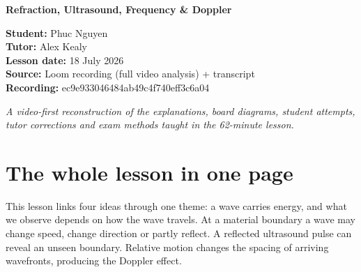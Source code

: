 \documentclass[11pt,a4paper]{article}
\begin{document}
\begin{titlepage}
\centering\vspace*{2.2cm}
{\Huge\bfseries Refraction, Ultrasound, Frequency \& Doppler\par}
\vspace{.5cm}{\Large GCSE Physics lesson-replacement guide\par}
\vspace{1.3cm}
\begin{tcolorbox}[colback=white,colframe=black,width=.82\textwidth]
\centering
\textbf{Student:} Phuc Nguyen\\
\textbf{Tutor:} Alex Kealy\\
\textbf{Lesson date:} 18 July 2026\\
\textbf{Source:} Loom recording (full video analysis) + transcript\\
\textbf{Recording:} ec9e933046484ab49c4f740eff3c6a04
\end{tcolorbox}
\vfill
\textit{A video-first reconstruction of the explanations, board diagrams, student attempts, tutor corrections and exam methods taught in the 62-minute lesson.}
\end{titlepage}
\tableofcontents\newpage

\section{The whole lesson in one page}
This lesson links four ideas through one theme: a wave carries energy, and what we observe depends on how the wave travels. At a material boundary a wave may change speed, change direction or partly reflect. A reflected ultrasound pulse can reveal an unseen boundary. Relative motion changes the spacing of arriving wavefronts, producing the Doppler effect.
\end{document}

